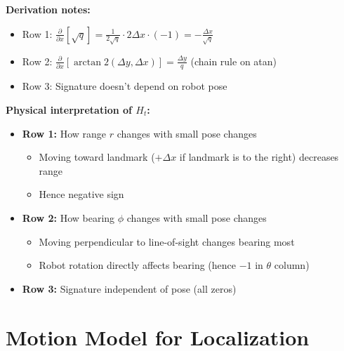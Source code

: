 \textbf{Derivation notes:}
\begin{itemize}
    \item Row 1: $\frac{\partial}{\partial x}[\sqrt{q}] = \frac{1}{2\sqrt{q}} \cdot 2\Delta x \cdot (-1) = -\frac{\Delta x}{\sqrt{q}}$
    \item Row 2: $\frac{\partial}{\partial x}[\arctan2(\Delta y, \Delta x)] = \frac{\Delta y}{q}$ (chain rule on atan)
    \item Row 3: Signature doesn't depend on robot pose
\end{itemize}

\begin{tcolorbox}[colback=green!5!white,colframe=green!60!black,title=Understanding the Jacobian]

\textbf{Physical interpretation of $H_t$:}

\begin{itemize}
    \item \textbf{Row 1:} How range $r$ changes with small pose changes
    \begin{itemize}
        \item Moving toward landmark ($+\Delta x$ if landmark is to the right) decreases range
        \item Hence negative sign
    \end{itemize}
    
    \item \textbf{Row 2:} How bearing $\phi$ changes with small pose changes
    \begin{itemize}
        \item Moving perpendicular to line-of-sight changes bearing most
        \item Robot rotation directly affects bearing (hence $-1$ in $\theta$ column)
    \end{itemize}
    
    \item \textbf{Row 3:} Signature independent of pose (all zeros)
\end{itemize}

\end{tcolorbox}

\section{Motion Model for Localization}

